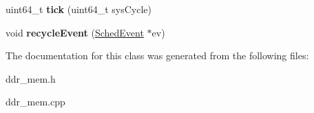 \begin{DoxyCompactItemize}
\item 
\hypertarget{classDDRMemory_a5ce560abc597aef55fa3f21b28d00d58}{uint64\-\_\-t {\bfseries tick} (uint64\-\_\-t sys\-Cycle)}\label{classDDRMemory_a5ce560abc597aef55fa3f21b28d00d58}

\item 
\hypertarget{classDDRMemory_a53c30add30e8bff9a8c8610ef449d86b}{void {\bfseries recycle\-Event} (\hyperlink{classSchedEvent}{Sched\-Event} $\ast$ev)}\label{classDDRMemory_a53c30add30e8bff9a8c8610ef449d86b}

\end{DoxyCompactItemize}


The documentation for this class was generated from the following files\-:\begin{DoxyCompactItemize}
\item 
ddr\-\_\-mem.\-h\item 
ddr\-\_\-mem.\-cpp\end{DoxyCompactItemize}
